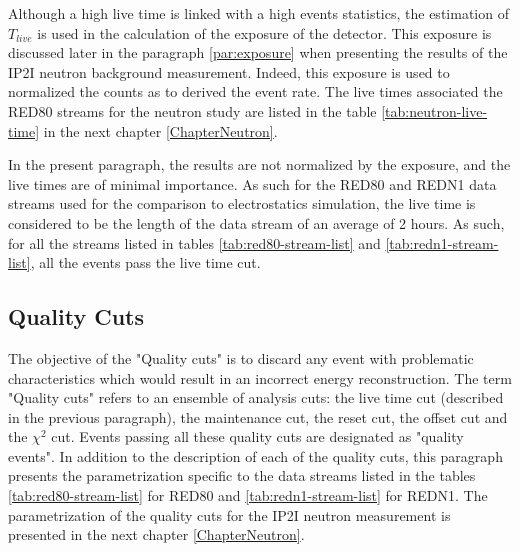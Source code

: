 Although a high live time is linked with a high events statistics, the estimation of $T_{live}$ is used in the calculation of the exposure of the detector. This exposure is discussed later in the paragraph \ref{par:exposure} when presenting the results of the IP2I neutron background measurement. Indeed, this exposure is used to normalized the counts as to derived the event rate. The live times associated the RED80 streams for the neutron study are listed in the table \ref{tab:neutron-live-time} in the next chapter \ref{ChapterNeutron}.

In the present paragraph, the results are not normalized by the exposure, and the live times are of minimal importance. As such for the RED80 and REDN1 data streams used for the comparison to electrostatics simulation, the live time is considered to be the length of the data stream of an average of 2 hours. As such, for all the streams listed in tables \ref{tab:red80-stream-list} and \ref{tab:redn1-stream-list}, all the events pass the live time cut.


\subsection{Quality Cuts}
\label{par:quality-cuts}


The objective of the "Quality cuts" is to discard any event with problematic characteristics which would result in an incorrect energy reconstruction. The term "Quality cuts" refers to an ensemble of analysis cuts: the live time cut (described in the previous paragraph), the maintenance cut, the reset cut, the offset cut and the $\chi^2$ cut. Events passing all these quality cuts are designated as "quality events". In addition to the description of each of the quality cuts, this paragraph presents the parametrization specific to the data streams listed in the tables \ref{tab:red80-stream-list} for RED80 and \ref{tab:redn1-stream-list} for REDN1. The parametrization of the quality cuts for the IP2I neutron measurement is presented in the next chapter \ref{ChapterNeutron}.

